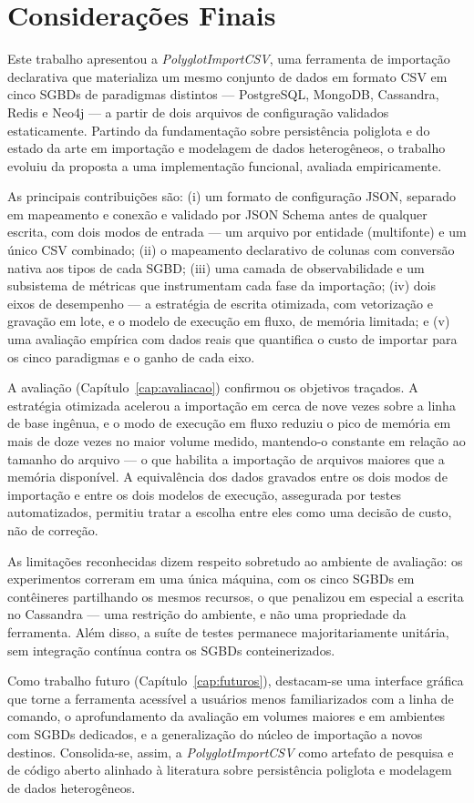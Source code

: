 \chapter{Considerações Finais}
\label{cap:conclusao}

Este trabalho apresentou a \textit{PolyglotImportCSV}, uma ferramenta de importação
declarativa que materializa um mesmo conjunto de dados em formato CSV em cinco SGBDs de
paradigmas distintos --- PostgreSQL, MongoDB, Cassandra, Redis e Neo4j --- a partir de dois
arquivos de configuração validados estaticamente. Partindo da fundamentação sobre
persistência poliglota e do estado da arte em importação e modelagem de dados heterogêneos,
o trabalho evoluiu da proposta a uma implementação funcional, avaliada empiricamente.

As principais contribuições são: (i) um formato de configuração JSON, separado em mapeamento
e conexão e validado por JSON Schema antes de qualquer escrita, com dois modos de entrada ---
um arquivo por entidade (multifonte) e um único CSV combinado; (ii) o mapeamento declarativo
de colunas com conversão nativa aos tipos de cada SGBD; (iii) uma camada de observabilidade e
um subsistema de métricas que instrumentam cada fase da importação; (iv) dois eixos de
desempenho --- a estratégia de escrita otimizada, com vetorização e gravação em lote, e o
modelo de execução em fluxo, de memória limitada; e (v) uma avaliação empírica com dados reais
que quantifica o custo de importar para os cinco paradigmas e o ganho de cada eixo.

A avaliação (Capítulo~\ref{cap:avaliacao}) confirmou os objetivos traçados. A estratégia
otimizada acelerou a importação em cerca de nove vezes sobre a linha de base ingênua, e o modo
de execução em fluxo reduziu o pico de memória em mais de doze vezes no maior volume medido,
mantendo-o constante em relação ao tamanho do arquivo --- o que habilita a importação de
arquivos maiores que a memória disponível. A equivalência dos dados gravados entre os dois
modos de importação e entre os dois modelos de execução, assegurada por testes automatizados,
permitiu tratar a escolha entre eles como uma decisão de custo, não de correção.

As limitações reconhecidas dizem respeito sobretudo ao ambiente de avaliação: os experimentos
correram em uma única máquina, com os cinco SGBDs em contêineres partilhando os mesmos
recursos, o que penalizou em especial a escrita no Cassandra --- uma restrição do ambiente, e
não uma propriedade da ferramenta. Além disso, a suíte de testes permanece majoritariamente
unitária, sem integração contínua contra os SGBDs conteinerizados.

Como trabalho futuro (Capítulo~\ref{cap:futuros}), destacam-se uma interface gráfica que torne
a ferramenta acessível a usuários menos familiarizados com a linha de comando, o aprofundamento
da avaliação em volumes maiores e em ambientes com SGBDs dedicados, e a generalização do núcleo
de importação a novos destinos. Consolida-se, assim, a \textit{PolyglotImportCSV} como artefato
de pesquisa e de código aberto alinhado à literatura sobre persistência poliglota e modelagem
de dados heterogêneos.
